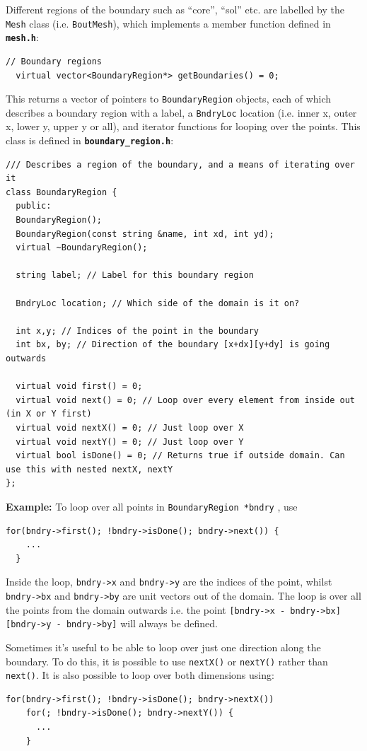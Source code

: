 \documentclass[12pt]{article}
\newcommand{\code}[1]{\texttt{#1}}
\newcommand{\file}[1]{\texttt{\bf #1}}
\begin{document}
Different regions of the boundary such as ``core'', ``sol'' etc. are
labelled by the \code{Mesh} class (i.e. \code{BoutMesh}), which
implements a member function defined in \file{mesh.h}:
\begin{lstlisting}[firstnumber=150]
  // Boundary regions
  virtual vector<BoundaryRegion*> getBoundaries() = 0;
\end{lstlisting}
This returns a vector of pointers to \code{BoundaryRegion} objects,
each of which describes a boundary region with a label, a \code{BndryLoc} 
location (i.e. inner x, outer x, lower y, upper y or all), and iterator
functions for looping over the points. This class is
defined in \file{boundary\_region.h}:
\begin{lstlisting}[firstnumber=12]
/// Describes a region of the boundary, and a means of iterating over it
class BoundaryRegion {
  public:
  BoundaryRegion();
  BoundaryRegion(const string &name, int xd, int yd);
  virtual ~BoundaryRegion();
  
  string label; // Label for this boundary region
  
  BndryLoc location; // Which side of the domain is it on?
  
  int x,y; // Indices of the point in the boundary
  int bx, by; // Direction of the boundary [x+dx][y+dy] is going outwards

  virtual void first() = 0;
  virtual void next() = 0; // Loop over every element from inside out (in X or Y first)
  virtual void nextX() = 0; // Just loop over X
  virtual void nextY() = 0; // Just loop over Y
  virtual bool isDone() = 0; // Returns true if outside domain. Can use this with nested nextX, nextY
};
\end{lstlisting}

{\bf Example:} To loop over all points in \code{BoundaryRegion *bndry} , use
\begin{lstlisting}[numbers=none]
  for(bndry->first(); !bndry->isDone(); bndry->next()) {
    ...
  }
\end{lstlisting}
Inside the loop, \code{bndry->x} and \code{bndry->y} are the indices
of the point, whilst \code{bndry->bx} and \code{bndry->by} are unit vectors
out of the domain. The loop is over all the points from the domain outwards 
i.e. the point
\code{[bndry->x - bndry->bx][bndry->y - bndry->by]} will always be defined.

Sometimes it's useful to be able to loop over just one direction along the
boundary. To do this, it is possible to use \code{nextX()} or \code{nextY()}
rather than \code{next()}. It is also possible to loop over both dimensions
using:
\begin{lstlisting}[numbers=none]
  for(bndry->first(); !bndry->isDone(); bndry->nextX())
    for(; !bndry->isDone(); bndry->nextY()) {
      ...
    }
\end{lstlisting}
\end{document}
